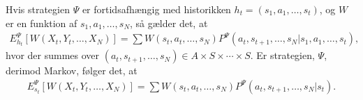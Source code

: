 Hvis strategien $\Psi$ er fortidsafhængig med historikken $h_t=(s_1, a_1 , \dots , s_t)$, og $W$ er en funktion af $s_1, a_1,\dots, s_N$, så gælder det, at
\begin{align}\label{eq:forventet_belønning_fortidsafhængig}
    E_{h_t}^\Psi \left[W(X_t , Y_t , \dots , X_N) \right] = \sum W(s_t , a_t , \dots , s_N) P^\Psi (a_t , s_{t+1} , \dots , s_N | s_1 , a_1 , \dots , s_t),
\end{align}
hvor der summes over $(a_t , s_{t+1} , \dots , s_N) \in A \times S \times \cdots \times S$. Er strategien, $\Psi$, derimod Markov, følger det, at
\begin{align*}
     E_{s_t}^\Psi \left[W(X_t , Y_t , \dots , X_N) \right] = \sum W(s_t , a_t , \dots , s_N) P^\Psi (a_t , s_{t+1} , \dots , s_N | s_t).
\end{align*}







